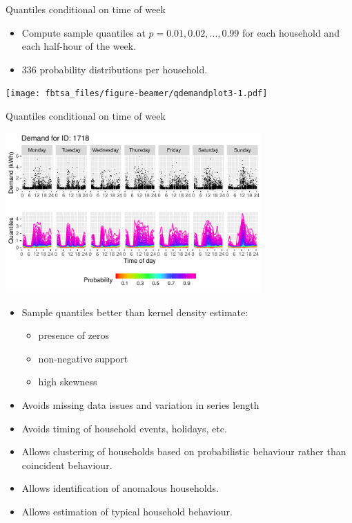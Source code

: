 \documentclass[14pt,ignorenonframetext,]{beamer}
\providecommand{\tightlist}{%
  \setlength{\itemsep}{0pt}\setlength{\parskip}{0pt}}
\begin{document}
\begin{frame}{Quantiles conditional on time of week}
\protect\hypertarget{quantiles-conditional-on-time-of-week-6}{}

\fontsize{11}{13}\sf

\begin{itemize}
\tightlist
\item
  Compute sample quantiles at \(p=0.01,0.02,\dots, 0.99\) for each
  household and each half-hour of the week.
\item
  \(336\) probability distributions per household.
\end{itemize}

\texttt{[image: fbtsa\_files/figure-beamer/qdemandplot3-1.pdf]}

\end{frame}

\begin{frame}{Quantiles conditional on time of week}
\protect\hypertarget{quantiles-conditional-on-time-of-week-7}{}

\fontsize{12}{13}\sf

\centerline{\includegraphics[width=9.8cm]{quantileplot}}

\begin{itemize}[<+->]
\tightlist
\item
  Sample quantiles better than kernel density estimate:

  \begin{itemize}
  \item presence of zeros
  \item non-negative support
  \item high skewness
  \end{itemize}
\item
  Avoids missing data issues and variation in series length
\item
  Avoids timing of household events, holidays, etc.
\item
  Allows clustering of households based on probabilistic behaviour
  rather than coincident behaviour.
\item
  Allows identification of anomalous households.
\item
  Allows estimation of typical household behaviour.
\end{itemize}

\end{frame}
\end{document}
